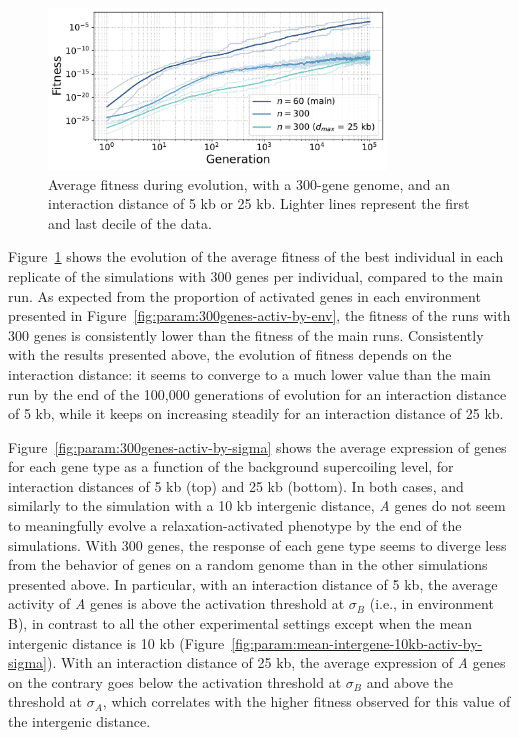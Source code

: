 \begin{figure}[H]
\centering
\includegraphics[width=0.8\textwidth]{param/300-genes/fitness_all_with_main.pdf}
\caption[Average fitness during evolution, with a 300-gene genome]{Average fitness during evolution, with a 300-gene genome, and an interaction distance of 5 kb or 25 kb.
Lighter lines represent the first and last decile of the data.}
\label{fig:param:300gene-fitness}
\end{figure}

Figure~\ref{fig:param:300gene-fitness} shows the evolution of the average fitness of the best individual in each replicate of the simulations with 300 genes per individual, compared to the main run.
As expected from the proportion of activated genes in each environment presented in Figure~\ref{fig:param:300genes-activ-by-env}, the fitness of the runs with 300 genes is consistently lower than the fitness of the main runs.
Consistently with the results presented above, the evolution of fitness depends on the interaction distance: it seems to converge to a much lower value than the main run by the end of the 100,000 generations of evolution for an interaction distance of 5 kb, while it keeps on increasing steadily for an interaction distance of 25 kb.

Figure~\ref{fig:param:300genes-activ-by-sigma} shows the average expression of genes for each gene type as a function of the background supercoiling level, for interaction distances of 5 kb (top) and 25 kb (bottom).
In both cases, and similarly to the simulation with a 10 kb intergenic distance, \emph{A} genes do not seem to meaningfully evolve a relaxation-activated phenotype by the end of the simulations.
With 300 genes, the response of each gene type seems to diverge less from the behavior of genes on a random genome than in the other simulations presented above.
In particular, with an interaction distance of 5 kb, the average activity of \emph{A} genes is above the activation threshold at $\sigma_B$ (i.e., in environment B), in contrast to all the other experimental settings except when the mean intergenic distance is 10 kb (Figure~\ref{fig:param:mean-intergene-10kb-activ-by-sigma}).
With an interaction distance of 25 kb, the average expression of \emph{A} genes on the contrary goes below the activation threshold at $\sigma_B$ and above the threshold at $\sigma_A$, which correlates with the higher fitness observed for this value of the intergenic distance.

